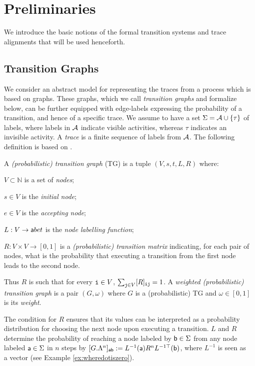 
\section{Preliminaries}
\label{sec:models}
We introduce the basic notions of the formal transition systems and trace alignments that will be used henceforth.

\subsection{Transition Graphs}\label{subsec:ppn}
We consider an abstract model for representing the traces from a process which is based on graphs. These
graphs, which we call \emph{transition graphs} and formalize below, can be further equipped with edge-labels expressing
the probability of a transition, and hence of a specific trace. We assume to have a set $\Sigma=\mathcal{A}\cup\{\tau\}$ of labels, where labels in $\mathcal{A}$ indicate visible activities, whereas $\tau$ indicates an invisible activity. A \textit{trace} is a finite sequence of labels from $\mathcal{A}$. The following definition is based on \cite{GartnerFW03}.

\begin{definition} A \emph{(probabilistic) transition graph} (TG) is a tuple $(V,s,t,L,R)$ where:
  \begin{inparaenum}[\itshape (i)]
    \item $V \subset \mathbb{N}$ is a set of \emph{nodes};
    \item $s\in V$ is the \emph{initial node};
    \item $e\in V$ is the \emph{accepting node};
    \item $L: V \to \mathsf{a}bet$ is the \emph{node labelling function};
    \item $R: V \times V \rightarrow [0,1]$ is a \emph{(probabilistic) transition matrix} indicating, for each pair of nodes,
    	what is the probability that executing a transition from the first node leads to the second node.
  \end{inparaenum}
Thus $R$ is such that for  every $\textnormal{\texttt{i}} \in V$, $\sum_{\textnormal{\texttt{j}}\in V}[R]_{\textnormal{\texttt{ij}}}=1$.
%
A \emph{weighted (probabilistic) transition graph} is a pair $(G,\omega)$ where $G$ is a (probabilistic) TG and
$\omega\in[0,1]$ is its \emph{weight}.
\end{definition}
%
The condition for $R$ ensures that its values can be interpreted as a probability distribution for choosing the next node upon
executing a transition. $L$ and $R$ determine the probability of reaching a node labeled by $\mathsf{b}\in\Sigma$ from any node
labeled $\mathsf{a}\in\Sigma$ in $n$ steps by
$[G.\Lambda^n]_{\mathsf{a}\mathsf{b}}:=L^{-1}(\mathsf{a})R^n L^{-1\top}(\mathsf{b})$,
where $L^{-1}$ is seen as a vector (see Example \ref{ex:wheredotiszero}).

